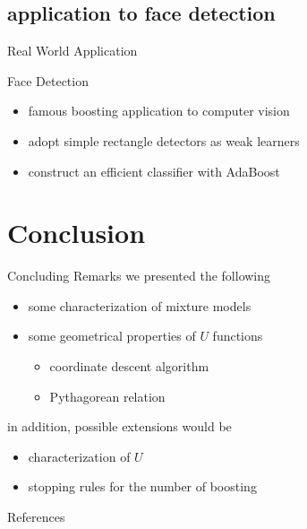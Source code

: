 \documentclass[fleqn,aspectratio=1610]{beamer}
\begin{document}
\subsection{application to face detection}
\label{sec:org92e4973}
\begin{frame}[label={sec:orga768f57}]{Real World Application}
\begin{exampleblock}{Face Detection}\label{sec:orgc55b87e}
\end{exampleblock}
\begin{itemize}
\item famous boosting application to computer vision
\item adopt simple rectangle detectors as weak learners
\item construct an efficient classifier with AdaBoost
\end{itemize}

\nocite{ViolaJones2004,DomingoWatanabe2000colt}
\end{frame}
\section{Conclusion}
\label{sec:org2b511f8}
\begin{frame}[label={sec:org95f68cc}]{Concluding Remarks}
we presented the following

\begin{itemize}
\item some characterization of mixture models
\item some geometrical properties of \(U\) functions
\begin{itemize}
\item coordinate descent algorithm
\item Pythagorean relation
\end{itemize}
\end{itemize}

in addition, possible extensions would be

\begin{itemize}
\item characterization of \(U\)
\item stopping rules for the number of boosting
\end{itemize}
\end{frame}

\begin{frame}[allowframebreaks]{References}
\printbibliography[heading=none]
\end{frame}
\end{document}
